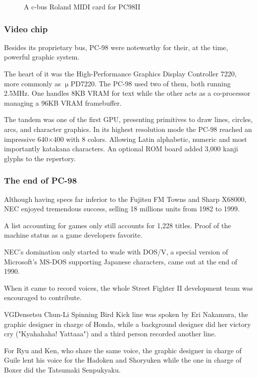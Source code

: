 \begin{figure}[H]

\caption*{A c-bus Roland MIDI card for PC98II}
\end{figure}



\subsubsection{Video chip}
Besides its proprietary bus, PC-98 were noteworthy for their, at the time, powerful graphic system.

The heart of it was the High-Performance Graphics Display Controller 7220, more commonly as $\upmu$PD7220. The PC-98 used two of them, both running 2.5MHz. One handles 8KB VRAM for text while the other acts as a co-processor managing a 96KB VRAM framebuffer.

The tandem was one of the first GPU, presenting primitives to draw lines, circles, arcs, and character graphics. In its highest resolution mode the PC-98 reached an impressive 640×400 with 8 colors. Allowing Latin alphabetic, numeric and most importantly katakana characters. An optional ROM board added 3,000 kanji glyphs to the repertory.   

\subsubsection{The end of PC-98}

Although having specs far inferior to the Fujitsu FM Towns and Sharp X68000, NEC enjoyed tremendous success, selling 18 millions units from 1982 to 1999.


A list accounting for games only still accounts for 1,228 titles. Proof of the machine status as a game developers favorite.

NEC's domination only started to wade with DOS/V, a special version of Microsoft's MS-DOS supporting Japanese characters, came out at the end of 1990.


\begin{trivia}
When it came to record voices, the whole Street Fighter II development team was encouraged to contribute.

\begin{q}{VGDensetsu\cite{sf2samples}  }
Chun-Li Spinning Bird Kick line was spoken by Eri Nakamura, the graphic designer in charge of Honda, while a background designer did her victory cry ("Kyahahaha! Yattaaa") and a third person recorded another line.

For Ryu and Ken, who share the same voice, the graphic designer in charge of Guile lent his voice for the Hadoken and Shoryuken while the one in charge of Boxer did the Tatsumaki Senpukyaku.  
\end{q}
\end{trivia}